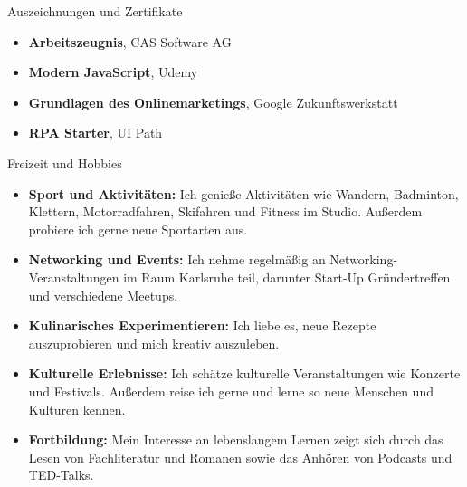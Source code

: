 \documentclass{resume} %
\begin{document}
\begin{rSection}{Auszeichnungen und Zertifikate}
    \begin{itemize}
        \item \textbf{Arbeitszeugnis}, CAS Software AG
        \item \textbf{Modern JavaScript}, Udemy
        \item \textbf{Grundlagen des Onlinemarketings}, Google Zukunftswerkstatt
        \item \textbf{RPA Starter}, UI Path
    \end{itemize}


\end{rSection}

\begin{rSection}{Freizeit und Hobbies}
    \begin{itemize}
        \item \raggedright{\textbf{Sport und Aktivitäten:} Ich genieße Aktivitäten wie Wandern, Badminton, Klettern, Motorradfahren, Skifahren und Fitness im Studio. Außerdem probiere ich gerne neue Sportarten aus.}
        \item \raggedright{\textbf{Networking und Events:} Ich nehme regelmäßig an Networking-Veranstaltungen im Raum Karlsruhe teil, darunter Start-Up Gründertreffen und verschiedene Meetups.}
        \item \raggedright{\textbf{Kulinarisches Experimentieren:} Ich liebe es, neue Rezepte auszuprobieren und mich kreativ auszuleben.} 
        \item \raggedright{\textbf{Kulturelle Erlebnisse:} Ich schätze kulturelle Veranstaltungen wie Konzerte und Festivals. Außerdem reise ich gerne und lerne so neue Menschen und Kulturen kennen.}
        \item \raggedright{\textbf{Fortbildung:} Mein Interesse an lebenslangem Lernen zeigt sich durch das Lesen von Fachliteratur und Romanen sowie das Anhören von Podcasts und TED-Talks.}
    \end{itemize}


\end{rSection}
\end{document}
